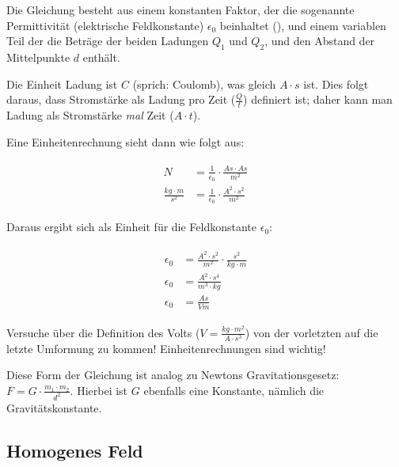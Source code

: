 Die Gleichung besteht aus einem konstanten Faktor, der die sogenannte \glqq Permittivität\grqq{} (\glqq elektrische Feldkonstante\grqq ) $\epsilon_0$ beinhaltet (), und einem variablen Teil der die Beträge der beiden Ladungen $Q_1$ und $Q_2$, und den Abstand der Mittelpunkte $d$ enthält.

Die Einheit Ladung ist $C$ (sprich: \glqq Coulomb\grqq ), was gleich $A \cdot s$ ist. Dies folgt daraus, dass Stromstärke als Ladung pro Zeit ($\frac{Q}{t}$) definiert ist; daher kann man Ladung als Stromstärke \emph{mal} Zeit ($A \cdot t$).

Eine Einheitenrechnung sieht dann wie folgt aus:

\begin{align}\label{eq:coulomb_gesetz_einheiten}
\begin{split}
	N 							&= \frac{1}{\epsilon_0} \cdot \frac{As \cdot As}{m^{2}} \\
	\frac{kg \cdot m}{s^{2}} 	&= \frac{1}{\epsilon_0} \cdot \frac{A^{2} \cdot s^{2}}{m^{2}}
\end{split}
\end{align}

\noindent Daraus ergibt sich als Einheit für die Feldkonstante $\epsilon_0$:

\begin{align}\label{eq:feldkonstante_einheiten}
\begin{split}
	\epsilon_0 &= \frac{A^{2} \cdot s^{2}}{m^{2}} \cdot \frac{s^{2}}{kg \cdot m} \\
	\epsilon_0 &= \frac{A^{2} \cdot s^{4}}{m^{3} \cdot kg} \\
	\epsilon_0 &= \frac{As}{Vm}
\end{split}
\end{align}

\begin{Aufgabe}
Versuche über die Definition des Volts ($V=\frac{kg \cdot m^2}{A \cdot s^3}$) von der vorletzten auf die letzte Umformung zu kommen! Einheitenrechnungen sind wichtig!
\end{Aufgabe}

\begin{NiceToKnow}
Diese Form der Gleichung ist analog zu Newtons Gravitationsgesetz: $F = G \cdot \frac{m_1 \cdot m_2}{d^2}$. Hierbei ist $G$ ebenfalls eine Konstante, nämlich die Gravitätskonstante.
\end{NiceToKnow}


\subsection{Homogenes Feld} \label{subsec:EFeldHomogen}

